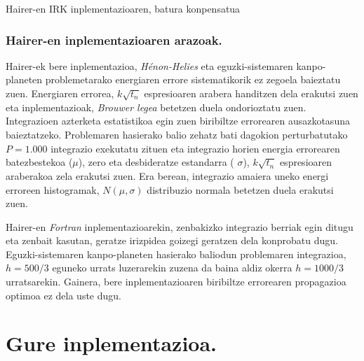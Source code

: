 \begin{algorithm}[h!]
  \caption{Hairer-en IRK inplementazioaren, batura konpensatua}
  \label{alg:Hairer-BK}
\end{algorithm} 


\subsubsection*{Hairer-en inplementazioaren arazoak.}

Hairer-ek bere inplementazioa, \emph{Hénon-Helies} eta eguzki-sistemaren kanpo-planeten problemetarako energiaren errore sistematikorik ez zegoela baieztatu zuen. Energiaren errorea, $k\sqrt{t_n}$ espresioaren arabera handitzen dela erakutsi zuen eta inplementazioak, \emph{Brouwer legea} \cite{Grazier2005} betetzen duela ondorioztatu zuen. Integrazioen azterketa estatistikoa egin zuen biribiltze errorearen ausazkotasuna baieztatzeko. Problemaren hasierako balio zehatz bati dagokion perturbatutako $P=1.000$ integrazio exekutatu zituen eta integrazio horien energia errorearen batezbestekoa ($\mu$), zero eta desbideratze estandarra ( $\sigma$), $k\sqrt{t_n}$ espresioaren araberakoa zela erakutsi zuen. Era berean, integrazio amaiera uneko energi erroreen histogramak, $N(\mu,\sigma)$ distribuzio normala betetzen duela erakutsi zuen.

Hairer-en \emph{Fortran} inplementazioarekin, zenbakizko integrazio berriak egin ditugu eta zenbait kasutan, geratze irizpidea goizegi geratzen dela konprobatu dugu. Eguzki-sistemaren kanpo-planeten hasierako baliodun problemaren integrazioa,  $h=500/3$ eguneko urrats luzerarekin zuzena da baina aldiz okerra $h=1000/3$ urratsarekin.  Gainera, bere inplementazioaren biribiltze errorearen propagazioa optimoa ez dela uste dugu. 


\section{Gure inplementazioa.}

